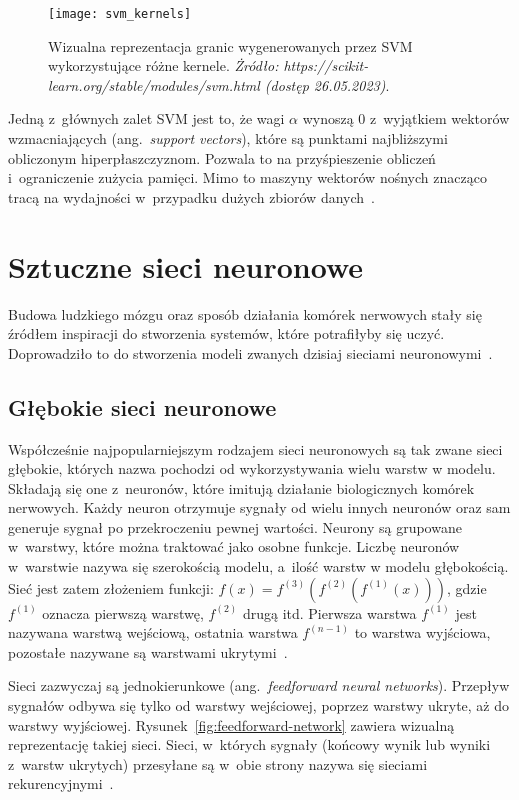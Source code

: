 \begin{figure}[h]
    \centering
    \texttt{[image: svm\_kernels]}
    \caption{Wizualna reprezentacja granic wygenerowanych przez SVM wykorzystujące różne kernele. \textit{Żródło: https://scikit-learn.org/stable/modules/svm.html (dostęp 26.05.2023)}.}
    \label{fig:svm-kernels}
\end{figure}

Jedną z~głównych zalet SVM jest to, że wagi \(\alpha\) wynoszą 0 z~wyjątkiem wektorów wzmacniających (ang.~\textit{support vectors}), które są punktami najbliższymi obliczonym hiperpłaszczyznom.
Pozwala to na przyśpieszenie obliczeń i~ograniczenie zużycia pamięci.
Mimo to maszyny wektorów nośnych znacząco tracą na wydajności w~przypadku dużych zbiorów danych~\cite{Russell2020, Goodfellow2016}.

\section{Sztuczne sieci neuronowe}\label{sec:sztuczne-sieci-neuronowe}

Budowa ludzkiego mózgu oraz sposób działania komórek nerwowych stały się źródłem inspiracji do stworzenia systemów, które potrafiłyby się uczyć.
Doprowadziło to do stworzenia modeli zwanych dzisiaj sieciami neuronowymi~\cite{Russell2020}.

\subsection{Głębokie sieci neuronowe}\label{subsec:gebokie-sieci-neuronowe}

Współcześnie najpopularniejszym rodzajem sieci neuronowych są tak zwane sieci głębokie, których nazwa pochodzi od wykorzystywania wielu warstw w modelu.
Składają się one z~neuronów, które imitują działanie biologicznych komórek nerwowych.
Każdy neuron otrzymuje sygnały od wielu innych neuronów oraz sam generuje sygnał po przekroczeniu pewnej wartości.
Neurony są grupowane w~warstwy, które można traktować jako osobne funkcje.
Liczbę neuronów w~warstwie nazywa się szerokością modelu, a~ilość warstw w modelu głębokością.
Sieć jest zatem złożeniem funkcji: \(f(x) = f^{(3)}(f^{(2)}(f^{(1)}(x)))\), gdzie \(f^{(1)}\) oznacza pierwszą warstwę, \(f^{(2)}\) drugą itd.
Pierwsza warstwa \(f^{(1)}\) jest nazywana warstwą wejściową, ostatnia warstwa \(f^{(n - 1)}\) to warstwa wyjściowa, pozostałe nazywane są warstwami ukrytymi~\cite{Goodfellow2016}.

Sieci zazwyczaj są jednokierunkowe (ang.~\textit{feedforward neural networks}).
Przepływ sygnałów odbywa się tylko od warstwy wejściowej, poprzez warstwy ukryte, aż do warstwy wyjściowej.
Rysunek~\ref{fig:feedforward-network} zawiera wizualną reprezentację takiej sieci.
Sieci, w~których sygnały (końcowy wynik lub wyniki z~warstw ukrytych) przesyłane są w~obie strony nazywa się sieciami rekurencyjnymi~\cite{Goodfellow2016}.

